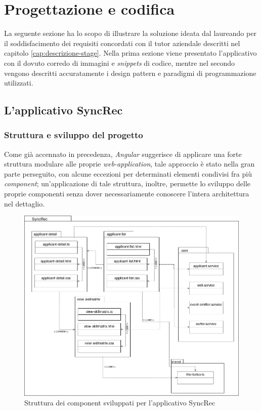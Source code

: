 
\chapter{Progettazione e codifica}
\label{cap:progettazione-codifica}

La seguente sezione ha lo scopo di illustrare la soluzione ideata dal laureando per il soddisfacimento dei requisiti concordati con il tutor aziendale descritti nel capitolo \ref{cap:descrizione-stage}. Nella prima sezione viene presentato l'applicativo con il dovuto corredo di immagini e \textit{snippets} di codice,  mentre nel secondo vengono descritti accuratamente i design pattern e paradigmi di programmazione utilizzati.


\section{L'applicativo SyncRec}
\subsection{Struttura e sviluppo del progetto}
Come già accennato in precedenza, \textit{Angular} suggerisce di applicare una forte struttura modulare alle proprie \textit{web-application}, tale approccio è stato nella gran parte perseguito, con alcune eccezioni per determinati elementi condivisi fra più \textit{component}; un'applicazione di tale struttura, inoltre, permette lo sviluppo delle proprie componenti senza dover necessariamente conoscere l'intera architettura nel dettaglio.

\begin{figure}[!h] 
	\centering 
	\includegraphics[width=1\columnwidth]{immagini/usecase/UML1} 
	\caption{Struttura dei component sviluppati per l'applicativo SyncRec}
	\label{figura:UML1}
\end{figure}

